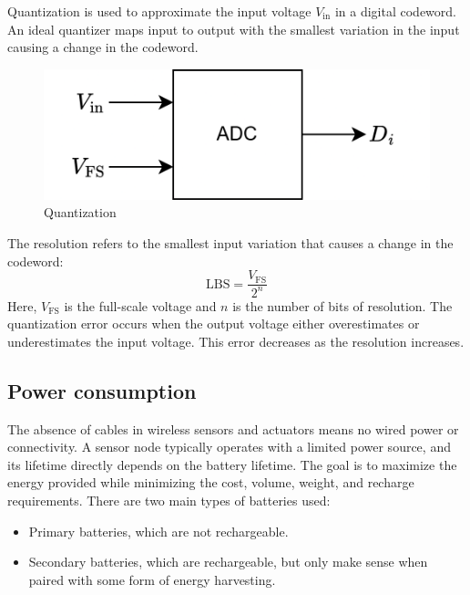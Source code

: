 Quantization is used to approximate the input voltage $V_{\text{in}}$ in a digital codeword. 
An ideal quantizer maps input to output with the smallest variation in the input causing a change in the codeword.
\begin{figure}[H]
    \centering
    \includegraphics[width=0.5\linewidth]{images/quant.png}
    \caption{Quantization}
\end{figure}
\noindent The resolution refers to the smallest input variation that causes a change in the codeword:
\[\text{LBS}=\dfrac{V_{\text{FS}}}{2^n}\]
Here, $V_{\text{FS}}$ is the full-scale voltage and $n$ is the number of bits of resolution.
The quantization error occurs when the output voltage either overestimates or underestimates the input voltage. 
This error decreases as the resolution increases.

\subsection{Power consumption}
The absence of cables in wireless sensors and actuators means no wired power or connectivity. 
A sensor node typically operates with a limited power source, and its lifetime directly depends on the battery lifetime. 
The goal is to maximize the energy provided while minimizing the cost, volume, weight, and recharge requirements.
There are two main types of batteries used:
\begin{itemize}
    \item Primary batteries, which are not rechargeable.
    \item Secondary batteries, which are rechargeable, but only make sense when paired with some form of energy harvesting.
\end{itemize}

